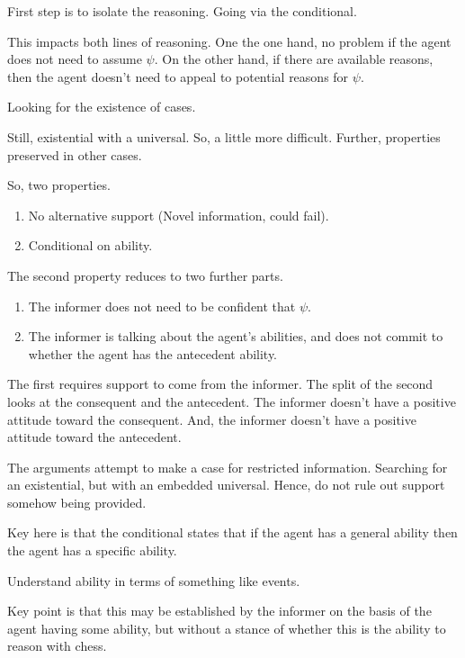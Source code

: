 \documentclass[10pt]{article}
\begin{document}
\begin{note}[Introduction]
  First step is to isolate the reasoning.
  Going via the conditional.

  This impacts both lines of reasoning.
  One the one hand, no problem if the agent does not need to assume \(\psi\).
  On the other hand, if there are available reasons, then the agent doesn't need to appeal to potential reasons for \(\psi\).

  Looking for the existence of cases.

  Still, existential with a universal.
  So, a little more difficult.
  Further, properties preserved in other cases.

  So, two properties.

  \begin{enumerate}
  \item No alternative support (Novel information, could fail).
  \item Conditional on ability.
  \end{enumerate}

  The second property reduces to two further parts.

  \begin{enumerate}
  \item The informer does not need to be confident that \(\psi\).
  \item The informer is talking about the agent's abilities, and does not commit to whether the agent has the antecedent ability.
  \end{enumerate}

  The first requires support to come from the informer.
  The split of the second looks at the consequent and the antecedent.
  The informer doesn't have a positive attitude toward the consequent.
  And, the informer doesn't have a positive attitude toward the antecedent.
\end{note}

\begin{note}
  The arguments attempt to make a case for restricted information.
  Searching for an existential, but with an embedded universal.
  Hence, do not rule out support somehow being provided.
\end{note}

\begin{note}
  Key here is that the conditional states that if the agent has a general ability then the agent has a specific ability.

  Understand ability in terms of something like events.

  Key point is that this may be established by the informer on the basis of the agent having some ability, but without a stance of whether this is the ability to reason with chess.
\end{note}
\end{document}
